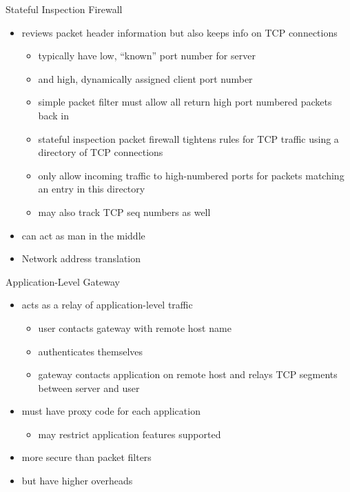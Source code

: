 \documentclass{beamer}
\begin{document}
\begin{frame}{Stateful Inspection Firewall}
  \begin{itemize}
  \item reviews packet header information but also keeps 
    info on TCP connections 
    \begin{itemize}
    \item typically have low, ``known'' port number for server 
    \item and high, dynamically assigned client port number
    \item simple packet filter must allow all return high port 
      numbered packets back in 
    \item stateful inspection packet firewall tightens rules for TCP 
      traffic using a directory of TCP connections 
    \item only allow incoming traffic to high-numbered ports for 
      packets matching an entry in this directory 
    \item may also track TCP seq numbers as well
    \end{itemize}
  \item can act as man in the middle
  \item Network address translation
  \end{itemize}
\end{frame}

\begin{frame}{Application-Level Gateway}
  \begin{itemize}
  \item acts as a relay of application-level traffic 
    \begin{itemize}
    \item user contacts gateway with remote host name 
    \item authenticates themselves 
    \item gateway contacts application on remote host and 
      relays TCP segments between server and user 
    \end{itemize}
  \item must have proxy code for each application 
    \begin{itemize}
    \item may restrict application features supported 
    \end{itemize}
  \item more secure than packet filters 
  \item but have higher overheads 
  \end{itemize}
\end{frame}
\end{document}
